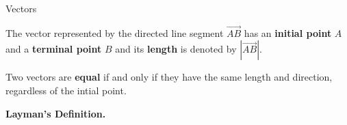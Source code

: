 \documentclass{report}
\begin{document}
\begin{sloppypar}
\begin{center}
{  \parbox{\textwidth} {
    \begin{definition}
      Vectors
    \end{definition}
    The vector represented by the directed
    line segment $  \vec{AB} $ has
    an \textbf{initial point} $A$ and a
    \textbf{terminal point} $B$ and
    its \textbf{length} is denoted by
    $ |\vec{AB}|$.

    Two vectors are \textbf{equal} if and
    only if they have the same length
    and direction, regardless of the
    intial point.

    \textbf{Layman's Definition.}
  }
}
\end{center}

\begin{center}
\end{center}


\end{sloppypar}
\end{document}
